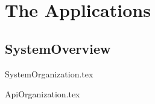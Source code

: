 
\chapter{The Applications}
\label{intro03} %


\section{SystemOverview}
\label{sec:03:1}

{SystemOrganization.tex}

{ApiOrganization.tex}


